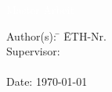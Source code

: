 %
%
%
%


\begin{titlepage}


{\sf
\vspace{5mm}
{\Huge\textcolor{white}{Master Arbeit}}\\[2mm]
{\Huge\textcolor{white}{\textbf{\mytitle}}}

{\color{white} 
\begin{tabbing}
Author(s): \hspace{20mm} \= \myauthor \hspace{20mm} \= ETH-Nr. \myethnr \\[3mm]
Supervisor: \> \myprofessor\\[1mm]
\> \mysupervisor\\[3mm]
Date: \> \today
\end{tabbing}
}
}
\vspace{7mm}
\begin{figure}[h!]
  \centering
  
\end{figure}




\end{titlepage}


%


